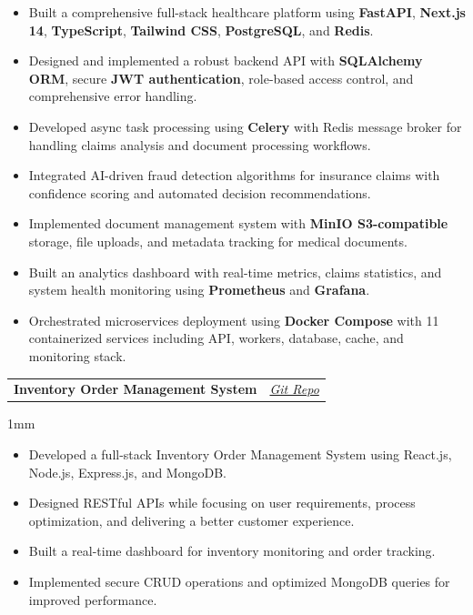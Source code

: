 \documentclass[a4paper,11pt]{article}
\makeatletter
\newcommand{\resumeProject}[3]{%
    \item
    \begin{tabular*}{0.98\textwidth}[t]{l@{\extracolsep{\fill}}r}
        \textbf{#1} & \textit{\footnotesize{#2}} \\
    \end{tabular*}
    \vspace{-5mm}
}
\newcommand{\resumeItemListStart}{\begin{justify}\begin{itemize}[leftmargin=3ex, rightmargin=2ex, noitemsep,labelsep=1.2mm,itemsep=0mm]\small}
\newcommand{\resumeItemListEnd}{\end{itemize}\end{justify}\vspace{-2mm}}
\makeatother
\begin{document}
\resumeItemListStart
    \item{Built a comprehensive full-stack healthcare platform using \textbf{FastAPI}, \textbf{Next.js 14}, \textbf{TypeScript}, \textbf{Tailwind CSS}, \textbf{PostgreSQL}, and \textbf{Redis}.}
    \item{Designed and implemented a robust backend API with \textbf{SQLAlchemy ORM}, secure \textbf{JWT authentication}, role-based access control, and comprehensive error handling.}
    \item{Developed async task processing using \textbf{Celery} with Redis message broker for handling claims analysis and document processing workflows.}
    \item{Integrated AI-driven fraud detection algorithms for insurance claims with confidence scoring and automated decision recommendations.}
    \item{Implemented document management system with \textbf{MinIO S3-compatible} storage, file uploads, and metadata tracking for medical documents.}
    \item{Built an analytics dashboard with real-time metrics, claims statistics, and system health monitoring using \textbf{Prometheus} and \textbf{Grafana}.}
    \item{Orchestrated microservices deployment using \textbf{Docker Compose} with 11 containerized services including API, workers, database, cache, and monitoring stack.}
\resumeItemListEnd

    \vspace{-1mm}

    \resumeProject
  {Inventory Order Management System}
  {\href{https://github.com/sainiansh3004/inventory-order-management-system}{\color{blue}Git Repo}}

\vspace{1mm}

\resumeItemListStart
    \item{Developed a full-stack Inventory Order Management System using React.js, Node.js, Express.js, and MongoDB.}
    \item{Designed RESTful APIs while focusing on user requirements, process optimization, and delivering a better customer experience.}
    \item{Built a real-time dashboard for inventory monitoring and order tracking.}
    \item{Implemented secure CRUD operations and optimized MongoDB queries for improved performance.}
\resumeItemListEnd

   \vspace{-5mm}
\end{document}
